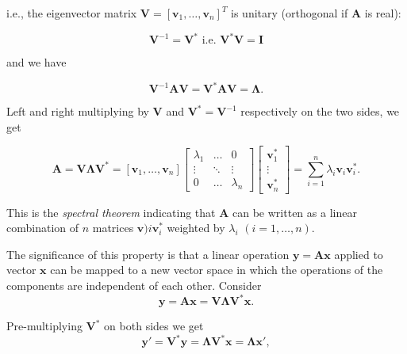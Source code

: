 \documentclass[10pt,b5paper,titlepage]{book}
\begin{document}
\begin{itemize}
i.e., the eigenvector matrix $\mathbf{V} = [\mathbf{v}_{1}, \dots, \mathbf{v}_{n}]^{T}$ is unitary (orthogonal if $\mathbf{A}$ is real):

\begin{equation}
\mathbf{V}^{-1} = \mathbf{V}^{*}
\text{ i.e. }
\mathbf{V}^{*}\mathbf{V} = \mathbf{I}
\end{equation}

and we have

\begin{equation}
\mathbf{V}^{-1} \mathbf{A} \mathbf{V} = \mathbf{V}^{*} \mathbf{A} \mathbf{V} = \mathbf{\Lambda}
.\end{equation}

Left and right multiplying by $\mathbf{V}$ and $\mathbf{V}^{*} = \mathbf{V}^{-1}$ respectively on the two sides, we get

\begin{equation}
\mathbf{A} = \mathbf{V} \mathbf{\Lambda} \mathbf{V}^{*} =
[\mathbf{v}_{1}, \dots, \mathbf{v}_{n}] \begin{bmatrix}
\lambda_{1} & \dots & 0\\
\vdots & \ddots & \vdots\\
0 & \dots & \lambda_{n}
\end{bmatrix} \begin{bmatrix}
\mathbf{v}_{1}^{*}\\
\vdots\\
\mathbf{v}_{n}^{*}
\end{bmatrix} =
\sum_{i=1}^{n}{\lambda_{i} \mathbf{v}_{i} \mathbf{v}_{i}^{*}}
.\end{equation}

This is the \textit{spectral theorem} indicating that $\mathbf{A}$ can be written as a linear combination of $n$ matrices $\mathbf{v}){i} \mathbf{v}_{i}^{*}$ weighted by $\lambda_{i}$ $(i = 1,\dots, n)$.

The significance of this property is that a linear operation $\mathbf{y} = \mathbf{A} \mathbf{x}$ applied to vector $\mathbf{x}$ can be mapped to a new vector space in which the operations of the components are independent of each other. Consider
\begin{equation}
\mathbf{y} = \mathbf{A} \mathbf{x} = \mathbf{V} \mathbf{\Lambda} \mathbf{V}^{*} \mathbf{x}
.\end{equation}

Pre-multiplying $\mathbf{V}^{*}$ on both sides we get
\begin{equation}
\mathbf{y}' = \mathbf{V}^{*} \mathbf{y} = \mathbf{\Lambda} \mathbf{V}^{*} \mathbf{x} = \mathbf{\Lambda} \mathbf{x}'
,\end{equation}


\end{itemize}
\end{document}
